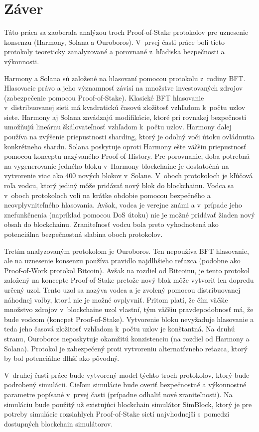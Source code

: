 \chapter{Záver}\label{chap:summary}

Táto práca sa zaoberala analýzou troch Proof-of-Stake protokolov pre uznesenie konsenzu (Harmony, Solana a Ouroboros). V~prvej časti práce boli tieto protokoly teoreticky zanalyzované a porovnané z~hľadiska bezpečnosti a výkonnosti.

Harmony a Solana sú založené na hlasovaní pomocou protokolu z~rodiny BFT. Hlasovacie právo a jeho významnosť závisí na množstve investovaných zdrojov (zabezpečenie pomocou Proof-of-Stake). Klasické BFT hlasovanie v~distribuovanej sieti má kvadratickú časovú zložitosť vzhľadom k~počtu uzlov siete. Harmony aj Solana zavádzajú modifikácie, ktoré pri rovnakej bezpečnosti umožňujú lineárnu škálovateľnosť vzhľadom k~počtu uzlov. Harmony ďalej používa na zvýšenie priepustnosti sharding, ktorý je odolný voči útoku ovládnutia konkrétneho shardu. Solana poskytuje oproti Harmony ešte väčšiu priepustnosť pomocou konceptu nazývaného Proof-of-History. Pre porovnanie, doba potrebná na vygenerovanie jedného bloku v~Harmony blockchaine je dostatočná na vytvorenie viac ako 400 nových blokov v~Solane. V~oboch protokoloch je kľúčová roľa vodcu, ktorý jediný môže pridávať nový blok do blockchainu. Vodca sa v~oboch protokoloch volí na krátke obdobie pomocou bezpečného a neovplyvniteľného hlasovania. Avšak, vodca je verejne známi a v~prípade jeho znefunkčnenia (napríklad pomocou DoS útoku) nie je možné pridávať žiaden nový obsah do blockchainu. Zraniteľnosť vodcu bola preto vyhodnotená ako potenciálna bezpečnostná slabina oboch protokolov.

Tretím analyzovaným protokolom je Ouroboros. Ten nepoužíva BFT hlasovanie, ale na uznesenie konsenzu používa pravidlo najdlhšieho reťazca (podobne ako Proof-of-Work protokol Bitcoin). Avšak na rozdiel od Bitcoinu, je tento protokol založený na koncepte Proof-of-Stake pretože nový blok môže vytvoriť len dopredu určený uzol. Tento uzol sa nazýva vodca a je zvolený pomocou distribuovanej náhodnej voľby, ktorú nie je možné ovplyvniť. Pritom platí, že čím väčšie množstvo zdrojov v~blockchaine uzol vlastní, tým väčšiu pravdepodobnosť má, že bude vodcom (koncpet Proof-of-Stake). Vytvorenie bloku nevyžaduje hlasovanie a teda jeho časová zložitosť vzhľadom k~počtu uzlov je konštantná. Na druhú stranu, Ouroboros neposkytuje okamžitú konzistenciu (na rozdiel od Harmony a Solana). Protokol je zabezpečený proti vytvoreniu alternatívneho reťazca, ktorý by bol potenciálne dlhší ako pôvodný.

V~druhej časti práce bude vytvorený model týchto troch protokolov, ktorý bude podrobený simulácii. Cieľom simulácie bude overiť bezpečnostné a výkonnostné parametre popísané v~prvej časti (prípadne odhaliť nové zraniteľnosti). Na simuláciu bude použitý už existujúci blockchain simulátor SimBlock, ktorý je pre potreby simulácie rozsiahlych Proof-of-Stake sietí najvhodnejší s~pomedzi dostupných blockchain simulátorov.

